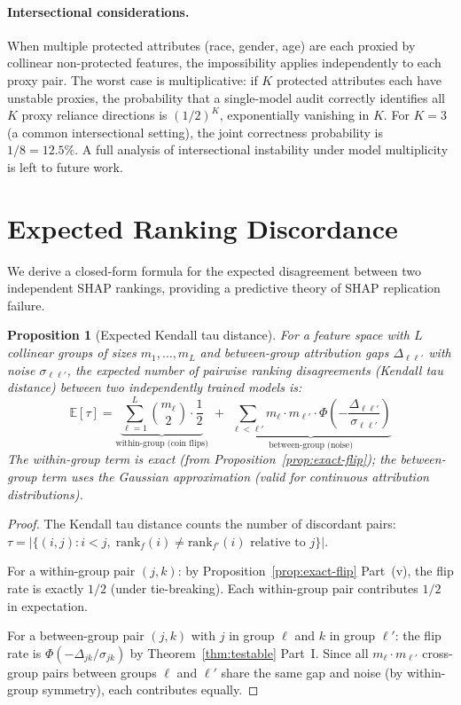 \documentclass{article}
\newtheorem{proposition}[theorem]{Proposition}
\begin{document}
\paragraph{Intersectional considerations.}
When multiple protected attributes (race, gender, age) are each proxied
by collinear non-protected features, the impossibility applies
independently to each proxy pair. The worst case is multiplicative: if
$K$ protected attributes each have unstable proxies, the probability
that a single-model audit correctly identifies all $K$ proxy reliance
directions is $(1/2)^K$, exponentially vanishing in $K$. For $K = 3$
(a common intersectional setting), the joint correctness probability is
$1/8 = 12.5\%$. A full analysis of intersectional instability under
model multiplicity is left to future work.

\section{Expected Ranking Discordance}

We derive a closed-form formula for the expected disagreement
between two independent SHAP rankings, providing a predictive
theory of SHAP replication failure.

\begin{proposition}[Expected Kendall tau distance]
\label{prop:kendall-tau}
For a feature space with $L$ collinear groups of sizes
$m_1, \ldots, m_L$ and between-group attribution gaps
$\Delta_{\ell\ell'}$ with noise $\sigma_{\ell\ell'}$, the expected
number of pairwise ranking disagreements (Kendall tau distance)
between two independently trained models is:
\begin{equation}
\label{eq:kendall-prediction}
    \mathbb{E}[\tau] =
    \underbrace{\sum_{\ell=1}^{L} \binom{m_\ell}{2} \cdot
    \frac{1}{2}}_{\text{within-group (coin flips)}}
    \;+\;
    \underbrace{\sum_{\ell < \ell'} m_\ell \cdot m_{\ell'} \cdot
    \Phi\!\left(-\frac{\Delta_{\ell\ell'}}
    {\sigma_{\ell\ell'}}\right)}_{\text{between-group (noise)}}
\end{equation}
The within-group term is exact (from
Proposition~\ref{prop:exact-flip}); the between-group term uses the
Gaussian approximation (valid for continuous attribution distributions).
\end{proposition}

\begin{proof}
The Kendall tau distance counts the number of discordant pairs:
$\tau = |\{(i,j) : i < j,\; \text{rank}_f(i) \neq \text{rank}_{f'}(i)
\text{ relative to } j\}|$.

For a within-group pair $(j,k)$: by
Proposition~\ref{prop:exact-flip} Part~(v), the flip rate is exactly
$1/2$ (under tie-breaking). Each within-group pair contributes
$1/2$ in expectation.

For a between-group pair $(j,k)$ with $j$ in group $\ell$ and $k$
in group $\ell'$: the flip rate is
$\Phi(-\Delta_{jk}/\sigma_{jk})$ by Theorem~\ref{thm:testable}
Part~I. Since all $m_\ell \cdot m_{\ell'}$ cross-group pairs between
groups $\ell$ and $\ell'$ share the same gap and noise (by
within-group symmetry), each contributes equally.
\end{proof}
\end{document}
